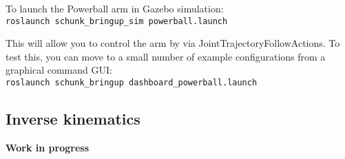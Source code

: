 To launch the Powerball arm in Gazebo simulation:\\
\texttt{roslaunch schunk\_bringup\_sim powerball.launch}

This will allow you to control the arm by via JointTrajectoryFollowActions. To test this, you can move to a small number of example configurations from a graphical command GUI:\\
\texttt{roslaunch schunk\_bringup dashboard\_powerball.launch}

\subsection{Inverse kinematics}

{\bf Work in progress}
